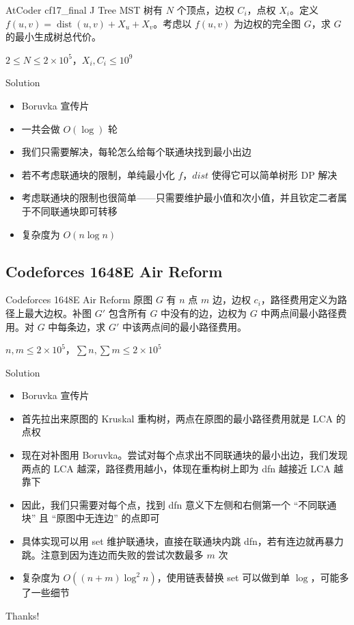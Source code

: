 ﻿\documentclass[aspectratio=169]{ctexbeamer}
\begin{document}
\begin{frame}{AtCoder cf17\_final J Tree MST}
      树有 $N$ 个顶点，边权 $C_i$，点权 $X_i$。定义 $f(u,v)=\operatorname{dist}(u,v)+X_u+X_v$。考虑以 $f(u,v)$ 为边权的完全图 $G$，求 $G$ 的最小生成树总代价。
      
      $2\le N\le 2\times 10^5$，$X_i,C_i\le 10^9$
\end{frame}

\begin{frame}{Solution}
    \begin{itemize}
        \item Boruvka 宣传片
        \item 一共会做 $O(\log)$ 轮
        \item 我们只需要解决，每轮怎么给每个联通块找到最小出边
        \item 若不考虑联通块的限制，单纯最小化 $f$，$dist$ 使得它可以简单树形 DP 解决
        \item 考虑联通块的限制也很简单——只需要维护最小值和次小值，并且钦定二者属于不同联通块即可转移
        \item 复杂度为 $O(n\log n)$
    \end{itemize}
\end{frame}




\subsection{Codeforces 1648E Air Reform}

\begin{frame}{Codeforces 1648E Air Reform}
      原图 $G$ 有 $n$ 点 $m$ 边，边权 $c_i$，路径费用定义为路径上最大边权。补图 $G'$ 包含所有 $G$ 中没有的边，边权为 $G$ 中两点间最小路径费用。对 $G$ 中每条边，求 $G'$ 中该两点间的最小路径费用。

      $n,m\le 2\times 10^5$，$\sum n,\sum m\le 2\times 10^5$
\end{frame}

\begin{frame}{Solution}
    \begin{itemize}
        \item Boruvka 宣传片
        \item 首先拉出来原图的 Kruskal 重构树，两点在原图的最小路径费用就是 LCA 的点权
        \item 现在对补图用 Boruvka。尝试对每个点求出不同联通块的最小出边，我们发现两点的 LCA 越深，路径费用越小，体现在重构树上即为 dfn 越接近 LCA 越靠下
        \item 因此，我们只需要对每个点，找到 dfn 意义下左侧和右侧第一个 “不同联通块” 且 “原图中无连边” 的点即可
        \item 具体实现可以用 set 维护联通块，直接在联通块内跳 dfn，若有连边就再暴力跳。注意到因为连边而失败的尝试次数最多 $m$ 次
        \item 复杂度为 $O((n+m)\log^2 n)$，使用链表替换 set 可以做到单 $\log$，可能多了一些细节
    \end{itemize}
\end{frame}


\begin{frame}
    \begin{center}
        {\Huge\calligra Thanks!}
    \end{center}
\end{frame}
\end{document}
